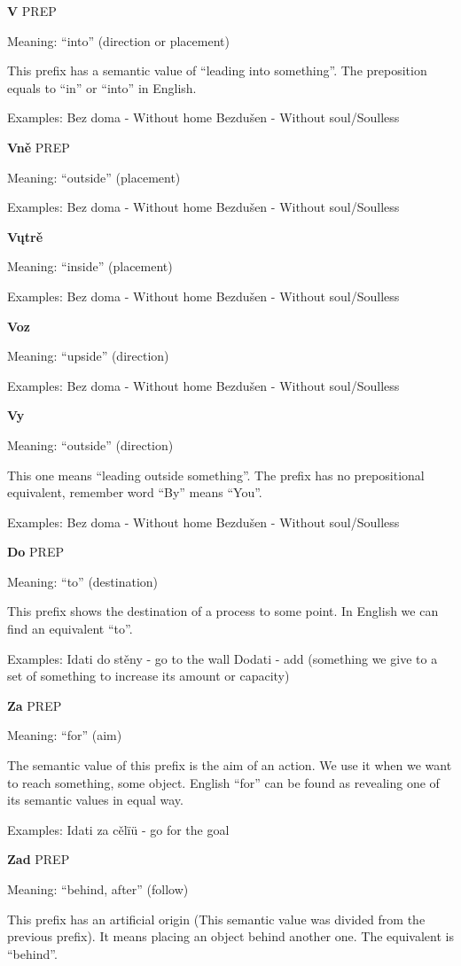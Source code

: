 \textbf{V} PREP

Meaning: “into” (direction or placement)

This prefix has a semantic value of “leading into something”. The preposition equals to “in” or “into” in English.

Examples:
Bez doma - Without home
Bezdušen - Without soul/Soulless 


\textbf{Vně} PREP

Meaning: “outside” (placement)

Examples:
Bez doma - Without home
Bezdušen - Without soul/Soulless 

\textbf{Vųtrě}

Meaning: “inside” (placement)

Examples:
Bez doma - Without home
Bezdušen - Without soul/Soulless 


\textbf{Voz}

Meaning: “upside” (direction)

Examples:
Bez doma - Without home
Bezdušen - Without soul/Soulless 

\textbf{Vy}

Meaning: “outside” (direction)

This one means “leading outside something”. The prefix has no prepositional equivalent, remember word “By” means “You”.

Examples:
Bez doma - Without home
Bezdušen - Without soul/Soulless 


\textbf{Do} PREP

Meaning: “to” (destination)

This prefix shows the destination of a process to some point. In English we can find an equivalent “to”.

Examples:
Idati do stěny - go to the wall
Dodati - add (something we give to a set of something to increase its amount or capacity)

\textbf{Za} PREP

Meaning: “for” (aim)

The semantic value of this prefix is the aim of an action. We use it when we want to reach something, some object. English “for” can be found as revealing one of its semantic values in equal way. 

Examples:
Idati za cělïü - go for the goal



\textbf{Zad} PREP

Meaning: “behind, after” (follow)

This prefix has an artificial origin (This semantic value was divided from the previous prefix). It means placing an object behind another one. The equivalent is “behind”.

